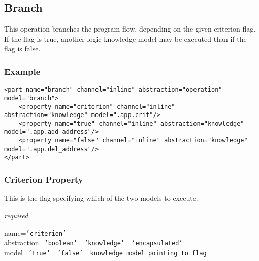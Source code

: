 %
%
%
%
%
%

\subsection{Branch}
\label{branch_heading}

This operation branches the program flow, depending on the given criterion
flag. If the flag is true, another logic knowledge model may be executed than
if the flag is false.

\subsubsection{Example}

\begin{scriptsize}
    \begin{verbatim}
<part name="branch" channel="inline" abstraction="operation" model="branch">
    <property name="criterion" channel="inline" abstraction="knowledge" model=".app.crit"/>
    <property name="true" channel="inline" abstraction="knowledge" model=".app.add_address"/>
    <property name="false" channel="inline" abstraction="knowledge" model=".app.del_address"/>
</part>
    \end{verbatim}
\end{scriptsize}

\subsubsection{Criterion Property}

This is the flag specifying which of the two models to execute.

\emph{required}

name=\texttt{'criterion'}\\
abstraction=\texttt{'boolean' \vline\ 'knowledge' \vline\ 'encapsulated'}\\
model=\texttt{'true' \vline\ 'false' \vline\ knowledge model pointing to flag}

